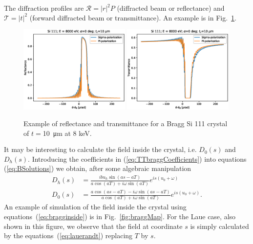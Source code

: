 \documentclass[preprint]{iucr}              %
\newcommand{\inblue}[1]{{\color{blue}#1}}
\newcommand{\inred}[1]{{\color{red}#1}}
\begin{document}
The diffraction profiles are $\mathcal{R}=|r|^2 P$ (diffracted beam or reflectance) and $\mathcal{T}=|t|^2$ (forward diffracted beam or transmittance).
An example is in Fig.~\ref{fig:braggProfiles}. 

\begin{figure}\label{fig:braggProfiles}
    \centering
    \includegraphics[width=0.49\textwidth]{figures/Bragg_1.eps}
    \includegraphics[width=0.49\textwidth]{figures/Bragg_2.eps}
    \caption{Example of reflectance and transmittance for a Bragg Si 111 crystal of $t=$\SI{10}{\micro\meter} at 8 keV. }
\end{figure}

\inred{
It may be interesting to calculate the field inside the crystal, i.e. $D_0(s)$ and $D_h(s)$. Introducing the coefficients in (\ref{eq:TTbraggCoefficients}) into equations (\ref{eq:BSolutions}) we obtain, after some algebraic manipulation
\begin{subequations}\label{eq:bragginside}
\begin{align}
D_h(s)&=\frac{i b u_h \sin(as - aT)}{a \cos(aT) + i \omega \sin(aT)} e^{is(u_0+\omega)}\\
D_0(s)&= \frac{a \cos(as-aT) - i \omega \sin(as-aT)}{a \cos(aT) + i \omega \sin(aT)} e^{is(u_0+\omega)}.
\end{align}
\end{subequations}
}
\inblue{
An example of simulation of the field inside the crystal using equations~(\ref{eq:bragginside}) is in Fig.~\ref{fig:braggMap}. For the Laue case, also shown in this figure, we observe that the field at coordinate $s$ is simply calculated by the equations~(\ref{eq:lauerandt}) replacing $T$ by $s$. 
}
\end{document}
